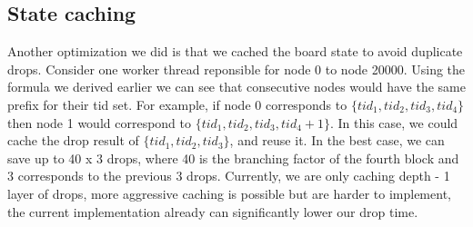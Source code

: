 \subsection{State caching}
Another optimization we did is that we cached the board state to avoid duplicate drops. Consider one worker thread reponsible for node 0 to node 20000. Using the formula we derived earlier we can see that consecutive nodes would have the same prefix for their tid set. For example, if node 0 corresponds to $\{ tid_{1}, tid_{2}, tid_{3},tid_{4}\}$ then node 1 would correspond to $\{ tid_{1}, tid_{2}, tid_{3},tid_{4} + 1\}$. In this case, we could cache the drop result of $\{ tid_{1}, tid_{2}, tid_{3}\}$, and reuse it. In the best case, we can save up to 40 x 3 drops, where 40 is the branching factor of the fourth block and 3 corresponds to the previous 3 drops. Currently, we are only caching depth - 1 layer of drops, more aggressive caching is possible but are harder to implement, the current implementation already can significantly lower our drop time.
